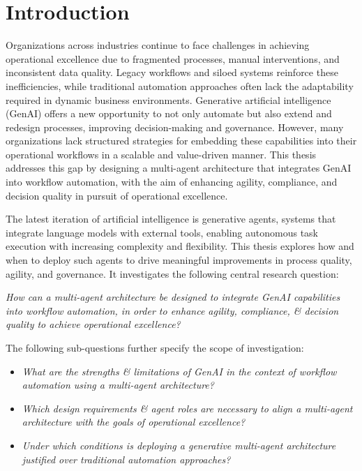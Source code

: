 \section{Introduction}
Organizations across industries continue to face challenges in achieving operational excellence due to fragmented processes, manual interventions, and inconsistent data quality. Legacy workflows and siloed systems reinforce these inefficiencies, while traditional automation approaches often lack the adaptability required in dynamic business environments. Generative artificial intelligence (GenAI) offers a new opportunity to not only automate but also extend and redesign processes, improving decision-making and governance. However, many organizations lack structured strategies for embedding these capabilities into their operational workflows in a scalable and value-driven manner. This thesis addresses this gap by designing a multi-agent architecture that integrates GenAI into workflow automation, with the aim of enhancing agility, compliance, and decision quality in pursuit of operational excellence.

The latest iteration of artificial intelligence is generative agents, systems that integrate language models with external tools, enabling autonomous task execution with increasing complexity and flexibility. This thesis explores how and when to deploy such agents to drive meaningful improvements in process quality, agility, and governance. It investigates the following central research question:

\vspace{0.5\baselineskip}
\emph{How can a multi-agent architecture be designed to integrate GenAI capabilities into workflow automation, in order to enhance agility, compliance, \& decision quality to achieve operational excellence?}
\vspace{0.5\baselineskip}

The following sub-questions further specify the scope of investigation:
\begin{itemize}
    \item \emph{What are the strengths \& limitations of GenAI in the context of workflow automation using a multi-agent architecture?}
    \item \emph{Which design requirements \& agent roles are necessary to align a multi-agent architecture with the goals of operational excellence?}
    \item \emph{Under which conditions is deploying a generative multi-agent architecture justified over traditional automation approaches?}
\end{itemize}

